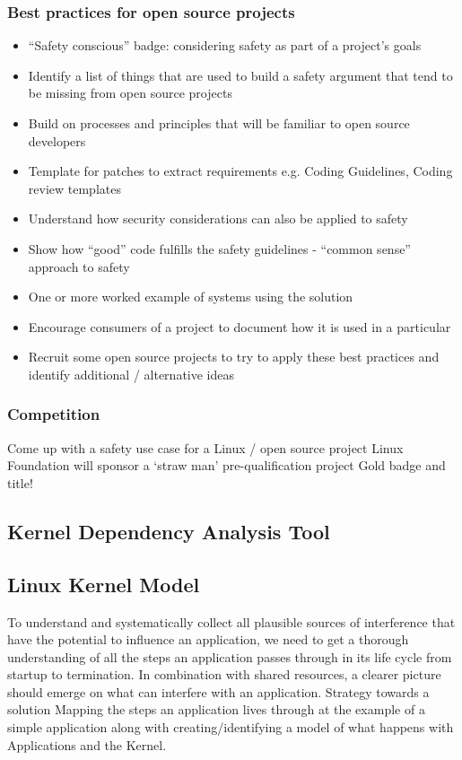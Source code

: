 \documentclass[12pt]{../Common_files/ElisaPaper}
\begin{document}
\subsubsection{Best practices for open source projects}

\begin{itemize}
\item “Safety conscious” badge: considering safety as part of a project’s goals
\item Identify a list of things that are used to build a safety argument that tend to be missing from open source projects
\item Build on processes and principles that will be familiar to open source developers
\item Template for patches to extract requirements e.g. Coding Guidelines, Coding review templates
\item Understand how security considerations can also be applied to safety
\item Show how “good” code fulfills the safety guidelines - “common sense” approach to safety
\item One or more worked example of systems using the solution
\item Encourage consumers of a project to document how it is used in a particular 
\item Recruit some open source projects to try to apply these best practices and identify additional / alternative ideas
\end{itemize}

\subsubsection{Competition}

Come up with a safety use case for a Linux / open source project
Linux Foundation will sponsor a ‘straw man’ pre-qualification project
Gold badge and title!



\subsection{Kernel Dependency Analysis Tool}

\subsection{Linux Kernel Model}
To understand and systematically collect all plausible sources of interference that have the potential to influence an application, we need to get a thorough understanding of all the steps an application passes through in its life cycle from startup to termination. 
In combination with shared resources, a clearer picture should emerge on what can interfere with an application.
Strategy towards a solution
Mapping the steps an application lives through at the example of a simple application along with creating/identifying a model of what happens with Applications and the Kernel.  
\end{document}
